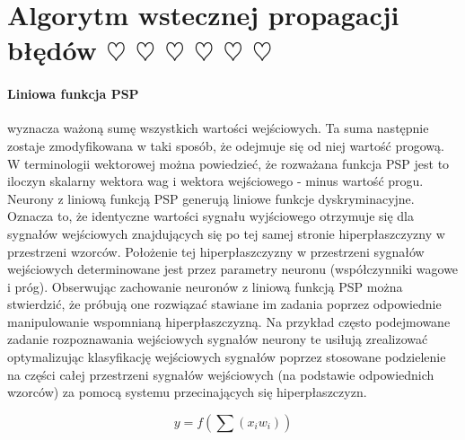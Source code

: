 \section{Algorytm wstecznej propagacji błędów $\heartsuit$ $\heartsuit$ $\heartsuit$ $\heartsuit$ $\heartsuit$ $\heartsuit$ }

\paragraph{Liniowa funkcja PSP} wyznacza ważoną sumę wszystkich wartości
wejściowych. Ta suma następnie zostaje zmodyfikowana w taki sposób, że
odejmuje się od niej wartość progową. W terminologii wektorowej można
powiedzieć, że rozważana funkcja PSP jest to iloczyn skalarny wektora
wag i wektora wejściowego - minus wartość progu. Neurony z liniową
funkcją PSP generują liniowe funkcje dyskryminacyjne. Oznacza to, że
identyczne wartości sygnału wyjściowego otrzymuje się dla sygnałów
wejściowych znajdujących się po tej samej stronie hiperpłaszczyzny w
przestrzeni wzorców. Położenie tej hiperpłaszczyzny w przestrzeni
sygnałów wejściowych determinowane jest przez parametry neuronu
(współczynniki wagowe i próg). Obserwując zachowanie neuronów z
liniową funkcją PSP można stwierdzić, że próbują one rozwiązać stawiane
im zadania poprzez odpowiednie manipulowanie wspomnianą
hiperpłaszczyzną. Na przykład często podejmowane zadanie
rozpoznawania wejściowych sygnałów neurony te usiłują zrealizować
optymalizując klasyfikację wejściowych sygnałów poprzez stosowane
podzielenie na części całej przestrzeni sygnałów wejściowych (na
podstawie odpowiednich wzorców) za pomocą systemu przecinających się
hiperpłaszczyzn. 

\begin{equation}
 y = f(\sum(x_i w_i))
\end{equation}


